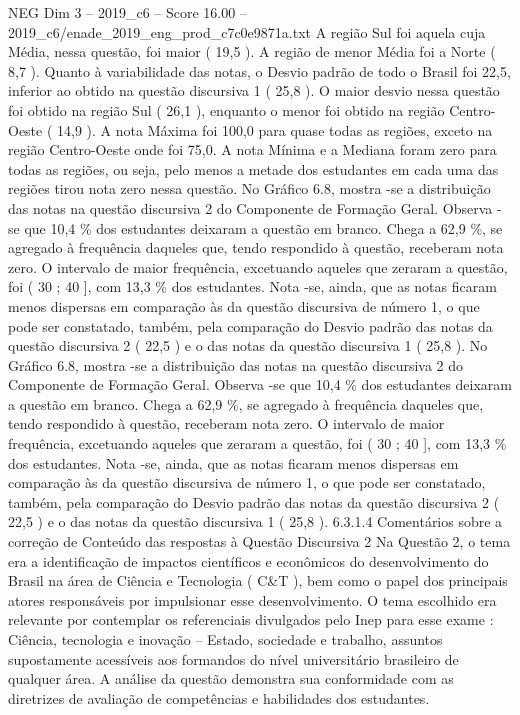 \begin{textsample}{NEG Dim 3 – 2019\_c6 – Score 16.00 – 2019\_c6/enade\_2019\_eng\_prod\_c7c0e9871a.txt}
A região Sul foi aquela cuja Média, nessa questão, foi maior ( 19,5 ).
A região de menor Média foi a Norte ( 8,7 ).
Quanto à variabilidade das notas, o Desvio padrão de todo o Brasil foi 22,5, inferior ao obtido na questão discursiva 1 ( 25,8 ).
O maior desvio nessa questão foi obtido na região Sul ( 26,1 ), enquanto o menor foi obtido na região Centro-Oeste ( 14,9 ).
A nota Máxima foi 100,0 para quase todas as regiões, exceto na região Centro-Oeste onde foi 75,0.
A nota Mínima e a Mediana foram zero para todas as regiões, ou seja, pelo menos a metade dos estudantes em cada uma das regiões tirou nota zero nessa questão.
No Gráfico 6.8, mostra -se a distribuição das notas na questão discursiva 2 do Componente de Formação Geral.
Observa -se que 10,4 \% dos estudantes deixaram a questão em branco.
Chega a 62,9 \%, se agregado à frequência daqueles que, tendo respondido à questão, receberam nota zero.
O intervalo de maior frequência, excetuando aqueles que zeraram a questão, foi ( 30 ; 40 ], com 13,3 \% dos estudantes.
Nota -se, ainda, que as notas ficaram menos dispersas em comparação às da questão discursiva de número 1, o que pode ser constatado, também, pela comparação do Desvio padrão das notas da questão discursiva 2 ( 22,5 ) e o das notas da questão discursiva 1 ( 25,8 ).
No Gráfico 6.8, mostra -se a distribuição das notas na questão discursiva 2 do Componente de Formação Geral.
Observa -se que 10,4 \% dos estudantes deixaram a questão em branco.
Chega a 62,9 \%, se agregado à frequência daqueles que, tendo respondido à questão, receberam nota zero.
O intervalo de maior frequência, excetuando aqueles que zeraram a questão, foi ( 30 ; 40 ], com 13,3 \% dos estudantes.
Nota -se, ainda, que as notas ficaram menos dispersas em comparação às da questão discursiva de número 1, o que pode ser constatado, também, pela comparação do Desvio padrão das notas da questão discursiva 2 ( 22,5 ) e o das notas da questão discursiva 1 ( 25,8 ). 6.3.1.4 Comentários sobre a correção de Conteúdo das respostas à Questão Discursiva 2 Na Questão 2, o tema era a identificação de impactos científicos e econômicos do desenvolvimento do Brasil na área de Ciência e Tecnologia ( C\&T ), bem como o papel dos principais atores responsáveis por impulsionar esse desenvolvimento.
O tema escolhido era relevante por contemplar os referenciais divulgados pelo Inep para esse exame : Ciência, tecnologia e inovação – Estado, sociedade e trabalho, assuntos supostamente acessíveis aos formandos do nível universitário brasileiro de qualquer área.
A análise da questão demonstra sua conformidade com as diretrizes de avaliação de competências e habilidades dos estudantes.

\end{textsample}
